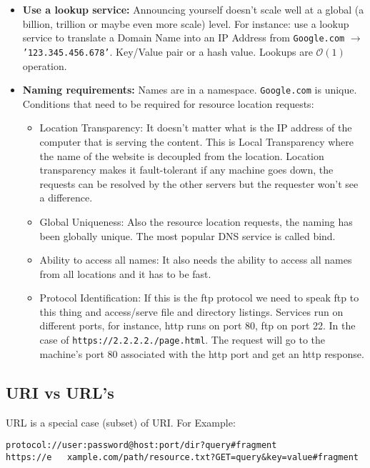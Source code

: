 \begin{itemize}[topsep=2pt]
%
    \item \textbf{Use a lookup service:} Announcing yourself doesn't scale well at a global (a billion, trillion or maybe even more scale) level. For instance: use a lookup service to translate a Domain Name into an IP Address from \texttt{Google.com} $\rightarrow$ \texttt{'123.345.456.678'}. Key/Value pair or a hash value. Lookups are $\mathcal{O}(1)$ operation.
    \item \textbf{Naming requirements:} Names are in a namespace. \texttt{Google.com} is unique. Conditions that need to be required for resource location requests:
        \begin{itemize}
            \item Location Transparency: It doesn't matter what is the IP address of the computer that is serving the content. This is Local Transparency where the name of the website is decoupled from the location. Location transparency makes it fault-tolerant if any machine goes down, the requests can be resolved by the other servers but the requester won't see a difference.
            \item Global Uniqueness: Also the resource location requests, the naming has been globally unique. The most popular DNS service is called bind.
            \item Ability to access all names: It also needs the ability to access all names from all locations and it has to be fast.
            \item Protocol Identification: If this is the ftp protocol we need to speak ftp to this thing and access/serve file and directory listings. Services run on different ports, for instance, http runs on port 80, ftp on port 22. In the case of \texttt{https://2.2.2.2./page.html}. The request will go to the machine's port 80 associated with the http port and get an http response.
	\end{itemize}
\end{itemize}


\subsection{URI vs URL's}

URL is a special case (subset) of URI. For Example:

\begin{verbatim}
protocol://user:password@host:port/dir?query#fragment
https://e	xample.com/path/resource.txt?GET=query&key=value#fragment
\end{verbatim}

